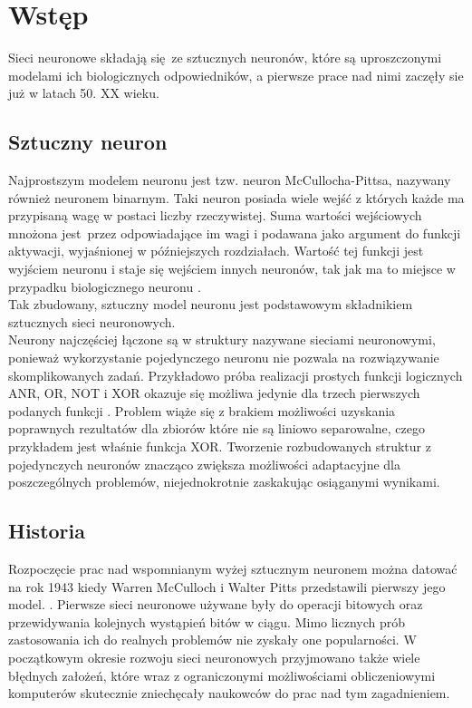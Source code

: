 
\chapter{Wstęp}

Sieci neuronowe składają się ze sztucznych neuronów, które są uproszczonymi modelami ich
biologicznych odpowiedników, a pierwsze prace nad nimi zaczęły sie już w latach 50.
XX wieku.

\section{Sztuczny neuron}


Najprostszym modelem neuronu jest tzw. neuron McCullocha-Pittsa, nazywany
również neuronem binarnym. Taki neuron posiada wiele wejść z których każde ma przypisaną
wagę w postaci liczby rzeczywistej. Suma wartości wejściowych mnożona jest przez odpowiadające
im wagi i podawana jako argument do funkcji aktywacji, wyjaśnionej w późniejszych rozdziałach.
Wartość tej funkcji jest wyjściem neuronu i staje się wejściem innych neuronów,
tak jak ma to miejsce w przypadku biologicznego neuronu \cite{CS231n}.\\
Tak zbudowany, sztuczny model neuronu jest podstawowym składnikiem sztucznych sieci
neuronowych.\\
Neurony najczęściej łączone są w struktury nazywane sieciami neuronowymi, ponieważ wykorzystanie
pojedynczego neuronu nie pozwala na rozwiązywanie skomplikowanych zadań.
Przykładowo próba realizacji prostych funkcji logicznych ANR, OR, NOT i XOR okazuje
się możliwa jedynie dla trzech pierwszych podanych funkcji \cite{XORproblem}.
Problem wiąże się z brakiem możliwości uzyskania poprawnych rezultatów dla zbiorów które
nie są liniowo separowalne, czego przykładem jest właśnie funkcja XOR. Tworzenie rozbudowanych
struktur z pojedynczych neuronów znacząco zwiększa możliwości adaptacyjne
dla poszczególnych problemów, niejednokrotnie zaskakując osiąganymi wynikami.

\section{Historia}

Rozpoczęcie prac nad wspomnianym wyżej sztucznym neuronem można datować na rok 1943 kiedy
Warren McCulloch i Walter Pitts przedstawili pierwszy jego model. \cite{NNbiology}.
Pierwsze sieci neuronowe używane były do operacji bitowych oraz przewidywania kolejnych
wystąpień bitów w ciągu. Mimo licznych prób zastosowania ich do realnych problemów
nie zyskały one popularności. W początkowym okresie rozwoju sieci neuronowych
przyjmowano także wiele błędnych założeń, które wraz z ograniczonymi możliwościami
obliczeniowymi komputerów skutecznie zniechęcały naukowców do prac nad tym zagadnieniem.\\

